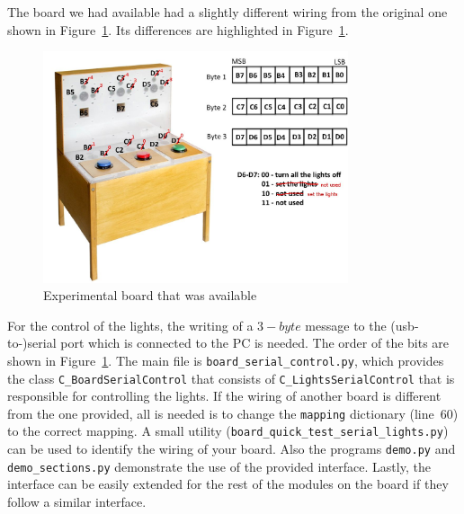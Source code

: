 The board we had available had a slightly different wiring from the
original one shown in Figure~\ref{fig:experimental_board2}. Its
differences are highlighted in Figure~\ref{fig:experimental_board2}.
\begin{figure}[htb]
\begin{center}
\includegraphics[width=0.8\textwidth]{lights2.jpg}
\end{center}
\caption{Experimental board that was available}
\label{fig:experimental_board2}
\end{figure}

For the control of the lights, the writing of a $3-byte$ message to
the (usb-to-)serial port which is connected to the PC is needed. The
order of the bits are shown in
Figure~\ref{fig:experimental_board2}. The main file is
\texttt{board\_serial\_control.py}, which provides the class
\texttt{C\_BoardSerialControl} that consists of
\texttt{C\_LightsSerialControl} that is responsible for controlling
the lights. If the wiring of another board is different from the one
provided, all is needed is to change the \texttt{mapping} dictionary
(line~60) to the correct mapping. A small utility
(\texttt{board\_quick\_test\_serial\_lights.py}) can be used to
identify the wiring of your board. Also the programs \texttt{demo.py}
and \texttt{demo\_sections.py} demonstrate the use of the provided
interface. Lastly, the interface can be easily extended for the rest
of the modules on the board if they follow a similar interface.
